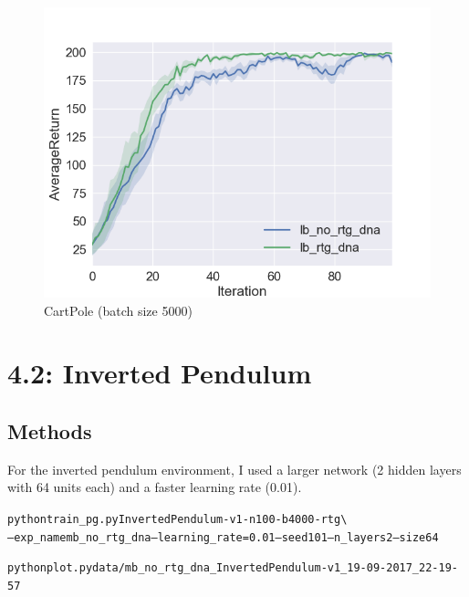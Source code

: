 \documentclass{article}\usepackage[]{graphicx}\usepackage[]{color}
\makeatletter
\newenvironment{kframe}{%
 \def\at@end@of@kframe{}%
 \ifinner\ifhmode%
  \def\at@end@of@kframe{\end{minipage}}%
  \begin{minipage}{\columnwidth}%
 \fi\fi%
 \def\FrameCommand##1{\hskip\@totalleftmargin \hskip-\fboxsep
 \colorbox{shadecolor}{##1}\hskip-\fboxsep
     \hskip-\linewidth \hskip-\@totalleftmargin \hskip\columnwidth}%
 \MakeFramed {\advance\hsize-\width
   \@totalleftmargin\z@ \linewidth\hsize
   \@setminipage}}%
 {\par\unskip\endMakeFramed%
 \at@end@of@kframe}
\newenvironment{knitrout}{}{} %
\makeatother
\begin{document}
\begin{figure}
  \includegraphics[width=\linewidth]{figures/lb_experiments_1.png}
  \caption{CartPole (batch size 5000)}
  \label{lb comparisons}
\end{figure}





\section*{4.2: Inverted Pendulum}

\subsection*{Methods}

For the inverted pendulum environment, I used a larger network (2 hidden layers with 64 units each) and a faster learning rate (0.01). 

\begin{knitrout}
\color{fgcolor}\begin{kframe}
\begin{alltt}
python train_pg.py InvertedPendulum-v1 -n 100 -b 4000 -rtg \textbackslash{} 
--exp_name mb_no_rtg_dna --learning_rate=0.01 --seed 101 --n_layers 2 --size 64

python plot.py data/mb_no_rtg_dna_InvertedPendulum-v1_19-09-2017_22-19-57


\end{alltt}
\end{kframe}
\end{knitrout}
\end{document}
